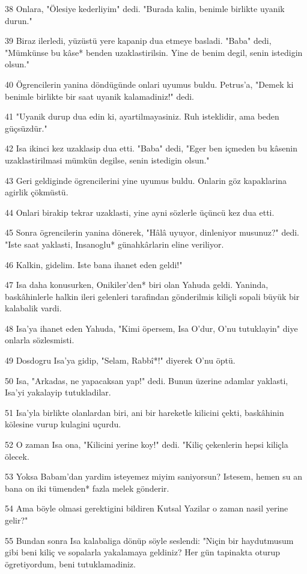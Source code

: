 \par 38 Onlara, "Ölesiye kederliyim" dedi. "Burada kalin, benimle birlikte uyanik durun."
\par 39 Biraz ilerledi, yüzüstü yere kapanip dua etmeye basladi. "Baba" dedi, "Mümkünse bu kâse* benden uzaklastirilsin. Yine de benim degil, senin istedigin olsun."
\par 40 Ögrencilerin yanina döndügünde onlari uyumus buldu. Petrus'a, "Demek ki benimle birlikte bir saat uyanik kalamadiniz!" dedi.
\par 41 "Uyanik durup dua edin ki, ayartilmayasiniz. Ruh isteklidir, ama beden güçsüzdür."
\par 42 Isa ikinci kez uzaklasip dua etti. "Baba" dedi, "Eger ben içmeden bu kâsenin uzaklastirilmasi mümkün degilse, senin istedigin olsun."
\par 43 Geri geldiginde ögrencilerini yine uyumus buldu. Onlarin göz kapaklarina agirlik çökmüstü.
\par 44 Onlari birakip tekrar uzaklasti, yine ayni sözlerle üçüncü kez dua etti.
\par 45 Sonra ögrencilerin yanina dönerek, "Hâlâ uyuyor, dinleniyor musunuz?" dedi. "Iste saat yaklasti, Insanoglu* günahkârlarin eline veriliyor.
\par 46 Kalkin, gidelim. Iste bana ihanet eden geldi!"
\par 47 Isa daha konusurken, Onikiler'den* biri olan Yahuda geldi. Yaninda, baskâhinlerle halkin ileri gelenleri tarafindan gönderilmis kiliçli sopali büyük bir kalabalik vardi.
\par 48 Isa'ya ihanet eden Yahuda, "Kimi öpersem, Isa O'dur, O'nu tutuklayin" diye onlarla sözlesmisti.
\par 49 Dosdogru Isa'ya gidip, "Selam, Rabbî*!" diyerek O'nu öptü.
\par 50 Isa, "Arkadas, ne yapacaksan yap!" dedi. Bunun üzerine adamlar yaklasti, Isa'yi yakalayip tutukladilar.
\par 51 Isa'yla birlikte olanlardan biri, ani bir hareketle kilicini çekti, baskâhinin kölesine vurup kulagini uçurdu.
\par 52 O zaman Isa ona, "Kilicini yerine koy!" dedi. "Kiliç çekenlerin hepsi kiliçla ölecek.
\par 53 Yoksa Babam'dan yardim isteyemez miyim saniyorsun? Istesem, hemen su an bana on iki tümenden* fazla melek gönderir.
\par 54 Ama böyle olmasi gerektigini bildiren Kutsal Yazilar o zaman nasil yerine gelir?"
\par 55 Bundan sonra Isa kalabaliga dönüp söyle seslendi: "Niçin bir haydutmusum gibi beni kiliç ve sopalarla yakalamaya geldiniz? Her gün tapinakta oturup ögretiyordum, beni tutuklamadiniz.
